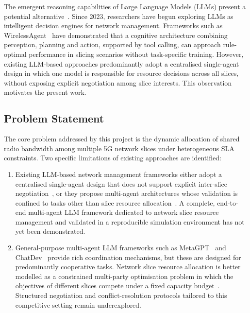 The emergent reasoning capabilities of Large Language Models (LLMs) present a potential alternative~\cite{zhou2024llmtelecom}. Since 2023, researchers have begun exploring LLMs as intelligent decision engines for network management. Frameworks such as WirelessAgent~\cite{tong2025wirelessagent} have demonstrated that a cognitive architecture combining perception, planning and action, supported by tool calling, can approach rule-optimal performance in slicing scenarios without task-specific training. However, existing LLM-based approaches predominantly adopt a centralised single-agent design in which one model is responsible for resource decisions across all slices, without exposing explicit negotiation among slice interests. This observation motivates the present work.

\subsection{Problem Statement}

The core problem addressed by this project is the dynamic allocation of shared radio bandwidth among multiple 5G network slices under heterogeneous SLA constraints. Two specific limitations of existing approaches are identified:

\begin{enumerate}
    \item Existing LLM-based network management frameworks either adopt a centralised single-agent design that does not support explicit inter-slice negotiation~\cite{tong2025wirelessagent,shao2024wirelessllm}, or they propose multi-agent architectures whose validation is confined to tasks other than slice resource allocation~\cite{jiang2024commllm}. A complete, end-to-end multi-agent LLM framework dedicated to network slice resource management and validated in a reproducible simulation environment has not yet been demonstrated.

    \item General-purpose multi-agent LLM frameworks such as MetaGPT~\cite{hong2023metagpt} and ChatDev~\cite{qian2023chatdev} provide rich coordination mechanisms, but these are designed for predominantly cooperative tasks. Network slice resource allocation is better modelled as a constrained multi-party optimisation problem in which the objectives of different slices compete under a fixed capacity budget~\cite{caballero2019games}. Structured negotiation and conflict-resolution protocols tailored to this competitive setting remain underexplored.
\end{enumerate}

